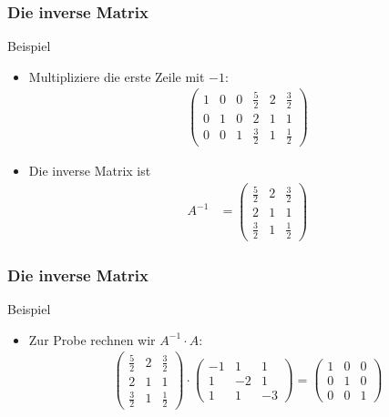\documentclass{beamer}
\newcommand{\mytitle}{Die inverse Matrix}
\begin{document}
\begin{frame}\frametitle{\mytitle}
	\begin{block}{Beispiel}
	\begin{itemize}
		\item Multipliziere die erste Zeile mit $-1$:
\begin{align*}
				\begin{pmatrix}
					1&0&0&\frac{5}{2}&2&\frac{3}{2}\\0&1&0&2&1&1\\0&0&1&\frac{3}{2}&1&\frac{1}{2} 
				\end{pmatrix}
			\end{align*}
		\item Die inverse Matrix ist
			\begin{align*}
				A^{-1}&=\begin{pmatrix}
					\frac{5}{2}&2&\frac{3}{2}\\2&1&1\\\frac{3}{2}&1&\frac{1}{2} 
				\end{pmatrix}
			\end{align*}
	\end{itemize}	
	\end{block}
\end{frame}

\begin{frame}\frametitle{\mytitle}
	\begin{block}{Beispiel}
	\begin{itemize}
		\item Zur Probe rechnen wir $A^{-1}\cdot A$:
			\begin{align*}
				\begin{pmatrix}
					\frac{5}{2}&2&\frac{3}{2}\\2&1&1\\\frac{3}{2}&1&\frac{1}{2} 
				\end{pmatrix}\cdot\begin{pmatrix} -1&1&1\\1&-2&1\\1&1&-3 \end{pmatrix}
				=\begin{pmatrix}
					1&0&0\\0&1&0\\0&0&1
				\end{pmatrix}
			\end{align*}
	\end{itemize}	
	\end{block}
\end{frame}
\end{document}
